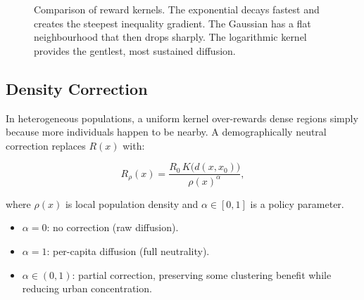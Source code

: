 \documentclass[12pt,a4paper]{article}
\theoremstyle{definition}
\begin{document}
\begin{figure}[ht]
\centering
{}
\caption{Comparison of reward kernels.  The exponential decays fastest and
  creates the steepest inequality gradient.  The Gaussian has a flat
  neighbourhood that then drops sharply.  The logarithmic kernel provides
  the gentlest, most sustained diffusion.}
\label{fig:kernels}
\end{figure}

\subsection{Density Correction}

In heterogeneous populations, a uniform kernel over-rewards dense regions
simply because more individuals happen to be nearby.  A demographically neutral
correction replaces $R(x)$ with:

\begin{equation}
  R_\rho(x) = \frac{R_0\,K\!\bigl(d(x,x_0)\bigr)}{\rho(x)^\alpha},
  \label{eq:densitycorrection}
\end{equation}

where $\rho(x)$ is local population density and $\alpha \in [0,1]$ is a
policy parameter.

\begin{itemize}[leftmargin=*]
  \item $\alpha = 0$: no correction (raw diffusion).
  \item $\alpha = 1$: per-capita diffusion (full neutrality).
  \item $\alpha \in (0,1)$: partial correction, preserving some clustering
    benefit while reducing urban concentration.
\end{itemize}
\end{document}
